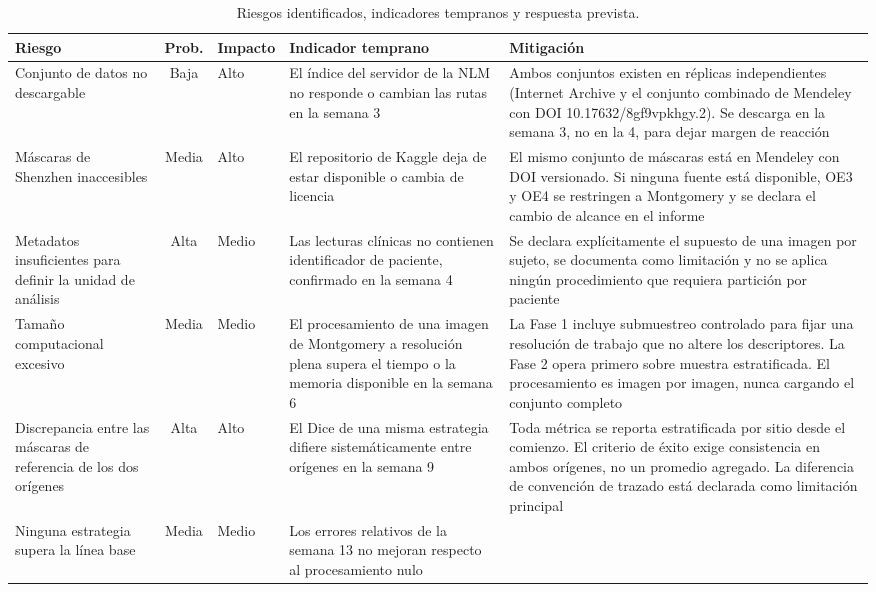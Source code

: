\documentclass[12pt,a4paper]{article}
\begin{document}
\begin{table}[H]
\centering
\caption{Riesgos identificados, indicadores tempranos y respuesta prevista.}
\scriptsize
\begin{tabular}{@{}p{2.5cm}cp{1.1cm}p{3.2cm}p{4.5cm}@{}}
\toprule
\textbf{Riesgo} & \textbf{Prob.} & \textbf{Impacto} & \textbf{Indicador temprano} & \textbf{Mitigación} \\
\midrule
Conjunto de datos no descargable &
Baja & Alto &
El índice del servidor de la NLM no responde o cambian las rutas en la semana 3 &
Ambos conjuntos existen en réplicas independientes (Internet Archive y el conjunto combinado de Mendeley con DOI 10.17632/8gf9vpkhgy.2). Se descarga en la semana 3, no en la 4, para dejar margen de reacción \\
\addlinespace
Máscaras de Shenzhen inaccesibles &
Media & Alto &
El repositorio de Kaggle deja de estar disponible o cambia de licencia &
El mismo conjunto de máscaras está en Mendeley con DOI versionado. Si ninguna fuente está disponible, OE3 y OE4 se restringen a Montgomery y se declara el cambio de alcance en el informe \\
\addlinespace
Metadatos insuficientes para definir la unidad de análisis &
Alta & Medio &
Las lecturas clínicas no contienen identificador de paciente, confirmado en la semana 4 &
Se declara explícitamente el supuesto de una imagen por sujeto, se documenta como limitación y no se aplica ningún procedimiento que requiera partición por paciente \\
\addlinespace
Tamaño computacional excesivo &
Media & Medio &
El procesamiento de una imagen de Montgomery a resolución plena supera el tiempo o la memoria disponible en la semana 6 &
La Fase 1 incluye submuestreo controlado para fijar una resolución de trabajo que no altere los descriptores. La Fase 2 opera primero sobre muestra estratificada. El procesamiento es imagen por imagen, nunca cargando el conjunto completo \\
\addlinespace
Discrepancia entre las máscaras de referencia de los dos orígenes &
Alta & Alto &
El Dice de una misma estrategia difiere sistemáticamente entre orígenes en la semana 9 &
Toda métrica se reporta estratificada por sitio desde el comienzo. El criterio de éxito exige consistencia en ambos orígenes, no un promedio agregado. La diferencia de convención de trazado está declarada como limitación principal \\
\addlinespace
Ninguna estrategia supera la línea base &
Media & Medio &
Los errores relativos de la semana 13 no mejoran respecto al procesamiento nulo &

\end{tabular}
\end{table}
\end{document}
